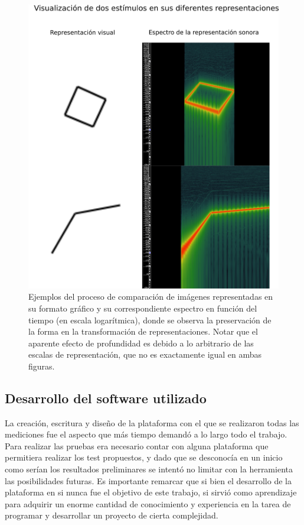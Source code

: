 \documentclass{article}
\numberwithin{figure}{section}
\begin{document}
    \begin{figure}
        \center
        \includegraphics[width=\textwidth]{Imagenes/TranformacionSVG.png}
        \caption{Ejemplos del proceso de comparación de imágenes representadas en su formato gráfico y su correspondiente espectro en función del tiempo (en escala logarítmica), donde se observa la preservación de la forma en la transformación de representaciones. Notar que el aparente efecto de profundidad es debido a lo arbitrario de las escalas de representación, que no es exactamente igual en ambas figuras.}
        \label{fig:TransformacionSVG}
    \end{figure}

    
\subsection{Desarrollo del software utilizado} \label{seccion:software}

    La creación, escritura y diseño de la plataforma con el que se realizaron todas las mediciones fue el aspecto que más tiempo demandó a lo largo todo el trabajo. Para realizar las pruebas era necesario contar con alguna plataforma que permitiera realizar los test propuestos, y dado que se desconocía en un inicio como serían los resultados preliminares se intentó no limitar con la herramienta las posibilidades futuras. Es importante remarcar que si bien el desarrollo de la plataforma en si nunca fue el objetivo de este trabajo, si sirvió como aprendizaje para adquirir un enorme cantidad de conocimiento y experiencia en la tarea de programar y desarrollar un proyecto de cierta complejidad. 
    
\end{document}
